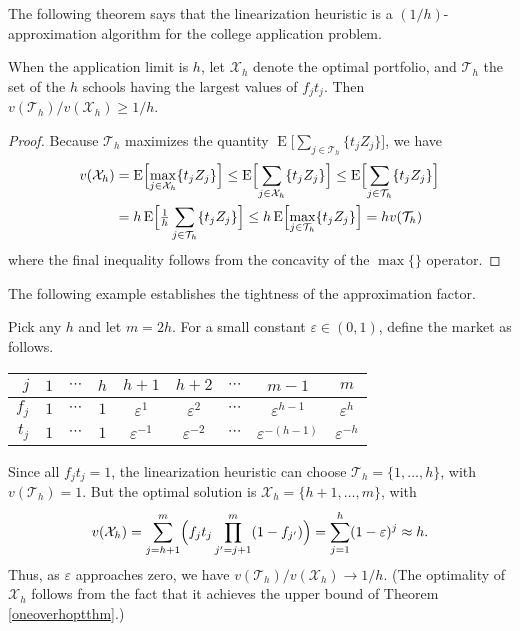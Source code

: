 The following theorem says that the linearization heuristic is a $(1/h)$-approximation algorithm for the college application problem. 
\begin{theorem} \label{oneoverhoptthm}
When the application limit is $h$, let $\mathcal{X}_h$ denote the optimal portfolio, and $\mathcal{T}_h$ the set of the $h$ schools having the largest values of $f_j t_j$. Then $v(\mathcal{T}_h) / v(\mathcal{X}_h) \geq 1/h$. 
\end{theorem}
\begin{proof}
Because $\mathcal{T}_h$ maximizes the quantity $\operatorname{E}\bigl[ \sum_{j \in \mathcal{T}_h}\{ t_j Z_j \}\bigr]$, we have
\begin{align} \label{oneoverhopt}
\begin{split}
v(\mathcal{X}_h) &= \operatorname{E}\Bigl[ \max_{j \in \mathcal{X}_h}\{ t_j Z_j \}\Bigr] \leq \operatorname{E}\Bigl[ \sum_{j \in \mathcal{X}_h}\{ t_j Z_j \}\Bigr] \leq \operatorname{E}\Bigl[ \sum_{j \in \mathcal{T}_h}\{ t_j Z_j \}\Bigr] \\
&= h  \operatorname{E}\Bigl[ \tfrac{1}{h} \sum_{j \in \mathcal{T}_h}\{ t_j Z_j \}\Bigr]
\leq h  \operatorname{E}\Bigl[ \max_{j \in \mathcal{T}_h}\{ t_j Z_j \}\Bigr]
= h v(\mathcal{T}_h)
\end{split}
\end{align}
where the final inequality follows from the concavity of the $\max\{\}$ operator.
\end{proof}

\noindent The following example establishes the tightness of the approximation factor. 

\begin{example} \label{tightexampleforoneoverhopt}
Pick any $h$ and let $m = 2h$. For a small constant $\varepsilon \in (0, 1)$, define the market as follows.
\begin{center}
\begin{tabular}{r|cccccccc}
$j$   & $1$      & $\cdots$ & $h$   &$h+1$         &  $h+2$ & $\cdots$ &      $m-1$  & $m$            \\ \hline
$f_j$ & $1$     &  $\cdots$ & $1$      & $\varepsilon^{1}$ & $\varepsilon^{2}$ & $\cdots$ & $\varepsilon^{h-1}$ & $\varepsilon^{h}$ \\
$t_j$ & $1$      &  $\cdots$ & $1$      & $\varepsilon^{-1}$ & $\varepsilon^{-2}$ & $\cdots$ & $\varepsilon^{-(h-1)}$ & $\varepsilon^{-h}$
\end{tabular}%
\end{center}
Since all $f_j t_j = 1$, the linearization heuristic can choose $\mathcal{T}_h = \{1, \dots, h\}$, with $v(\mathcal{T}_h) = 1$. But the optimal solution is $\mathcal{X}_h = \{h+1, \dots, m\}$, with
\begin{equation}
v(\mathcal{X}_h) = \sum_{j= h +1}^m \Bigl( f_j t_j \prod_{j' = j+1}^m (1 - f_{j'}) \Bigr) =  \sum_{j= 1}^h  (1 - \varepsilon)^{j} \approx h.
\end{equation}
Thus, as $\varepsilon$ approaches zero, we have $v(\mathcal{T}_h) / v(\mathcal{X}_h) \to 1/h$. (The optimality of $\mathcal{X}_h$ follows from the fact that it achieves the upper bound of Theorem \ref{oneoverhoptthm}.)
\end{example}

